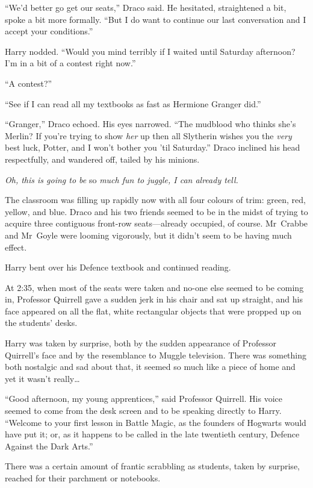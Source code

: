 “We’d better go get our seats,” Draco said. He hesitated, straightened a bit, spoke a bit more formally. “But I do want to continue our last conversation and I accept your conditions.”

Harry nodded. “Would you mind terribly if I waited until Saturday afternoon? I’m in a bit of a contest right now.”

“A contest?”

“See if I can read all my textbooks as fast as Hermione Granger did.”

“Granger,” Draco echoed. His eyes narrowed. “The mudblood who thinks she’s Merlin? If you’re trying to show \emph{her} up then all Slytherin wishes you the \emph{very} best luck, Potter, and I won’t bother you ’til Saturday.” Draco inclined his head respectfully, and wandered off, tailed by his minions.

\emph{Oh, this is going to be} so \emph{much fun to juggle, I can already tell.}

The classroom was filling up rapidly now with all four colours of trim: green, red, yellow, and blue. Draco and his two friends seemed to be in the midst of trying to acquire three contiguous front-row seats—already occupied, of course. Mr~Crabbe and Mr~Goyle were looming vigorously, but it didn’t seem to be having much effect.

Harry bent over his Defence textbook and continued reading.

\later

At 2:35\pm, when most of the seats were taken and no-one else seemed to be coming in, Professor Quirrell gave a sudden jerk in his chair and sat up straight, and his face appeared on all the flat, white rectangular objects that were propped up on the students’ desks.

Harry was taken by surprise, both by the sudden appearance of Professor Quirrell’s face and by the resemblance to Muggle television. There was something both nostalgic and sad about that, it seemed so much like a piece of home and yet it wasn’t really…

“Good afternoon, my young apprentices,” said Professor Quirrell. His voice seemed to come from the desk screen and to be speaking directly to Harry. “Welcome to your first lesson in Battle Magic, as the founders of Hogwarts would have put it; or, as it happens to be called in the late twentieth century, Defence Against the Dark Arts.”

There was a certain amount of frantic scrabbling as students, taken by surprise, reached for their parchment or notebooks.

